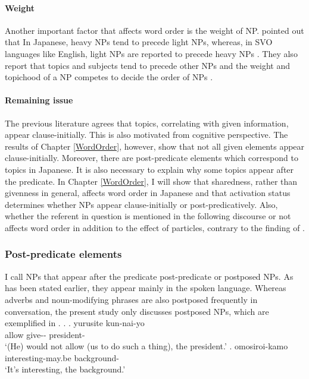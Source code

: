 \paragraph{Weight}

Another important factor that affects word order is the weight of NP.
 pointed out that
In Japanese,
heavy NPs tend to precede light NPs,
whereas, in SVO languages like English,
light NPs are reported to precede heavy NPs \cite[e.g.,][]{arnoldetal00}.
They also report that topics and subjects tend to precede other NPs
and the weight and topichood of a NP competes to decide the order of NPs \cite[see also][]{kondoyamashita07}.


\paragraph{Remaining issue}

The previous literature agrees that topics,
correlating with given information, appear clause-initially.
This is also motivated from cognitive perspective.
The results of Chapter \ref{WordOrder}, however, show that
not all given elements appear clause-initially.
Moreover, there are post-predicate elements which correspond to topics in Japanese.
It is also necessary to explain why some topics appear after the predicate.
In Chapter \ref{WordOrder},
I will show that sharedness,
rather than givenness in general,
affects word order in Japanese and that
activation status determines whether
NPs appear clause-initially or post-predicatively.
Also, whether the referent in question is mentioned in the following discourse or not affects word order in addition to the effect of particles,
contrary to the finding of .

\subsubsection{Post-predicate elements}\label{Back:CharJ:WO:PostP}

I call NPs that appear after the predicate post-predicate or postposed NPs.
As has been stated earlier,
they appear mainly in the spoken language.
Whereas adverbs and noun-modifying phrases are also postposed frequently in conversation,
the present study only discusses postposed NPs,
which are exemplified in \Next.
%
\ex.
 \ag. yurusite kun-nai-yo  \\
      allow give-- president- \\
      `(He) would not allow (us to do such a thing), the president.'
      \hfill{\cite[431]{onosuzuki92}}
 \bg. omosiroi-kamo  \\
      interesting-may.be background- \\
      `It's interesting, the background.'
      \hfill{\cite[9]{nakagawaetal08_paper}}


